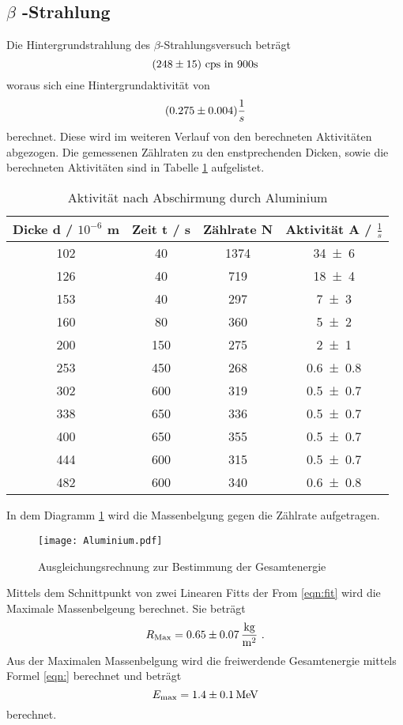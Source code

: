 \subsection{\texorpdfstring{$\beta$ -Strahlung }%
                               {beta -Strahlung}}
Die Hintergrundstrahlung des $\beta$-Strahlungsversuch beträgt 
\begin{equation}
  (\num{248 +- 15}) \text{ cps in } 900 \text{s}
  \label{eqn:hintb}
\end{equation}
woraus sich eine Hintergrundaktivität von 
\begin{equation}
  (\num{0.275 +- 0.004}) \frac{1}{s}
  \label{eqn:HAB}
\end{equation} 
berechnet. Diese wird im weiteren Verlauf von den berechneten Aktivitäten abgezogen. Die gemessenen Zählraten zu den enstprechenden Dicken, sowie die berechneten Aktivitäten sind in Tabelle \ref{tab:AAlu} aufgelistet. 
\begin{table}
  \centering
  \begin{tabular}{c c c c}
    \toprule
    Dicke d / $10^{-6}$ m & Zeit t / s & Zählrate N & Aktivität A / $\frac{1}{s}$ \\
    \midrule
    102&	40 &	1374&	\num{34 +-6 } \\	
    126&	40 &	719&	\num{18 +-4 } \\	
    153&	40 &	297&	\num{7 +-3 } \\	
    160&	80 &	360&	\num{5 +-2 } \\	
    200&	150&	275&	\num{2 +-1 } \\	
    253&	450&	268&	\num{0.6 +-0.8 } \\	
    302&	600&	319&	\num{0.5 +-0.7 } \\	
    338&	650&	336&	\num{0.5 +-0.7 } \\	
    400&	650&	355&	\num{0.5 +-0.7 } \\	
    444&	600&	315&	\num{0.5 +-0.7 } \\	
    482&	600&	340&	\num{0.6 +-0.8 } \\	
    \bottomrule
  \end{tabular}
  \caption{Aktivität nach Abschirmung durch Aluminium}
  \label{tab:AAlu}
\end{table}
In dem Diagramm \ref{fig:Alu} wird die Massenbelgung gegen die Zählrate aufgetragen. 
\begin{figure}
  \centering
  \texttt{[image: Aluminium.pdf]}
  \caption{Ausgleichungsrechnung zur Bestimmung der Gesamtenergie}
  \label{fig:Alu}
\end{figure}
Mittels dem Schnittpunkt von zwei Linearen Fitts der From \eqref{eqn:fit} wird die Maximale Massenbelgeung berechnet. Sie beträgt 
\begin{equation}
  R_\text{Max} = \num{0.65 +- 0.07} \, \frac{\text{kg}}{\text{m}^2} \ . 
  \label{eqn:Rmax}
\end{equation}
Aus der Maximalen Massenbelgung wird die freiwerdende Gesamtenergie mittels Formel \eqref{eqn:} berechnet und beträgt
\begin{equation}
  E_\text{max} = \num{1.4 +- 0.1} \, \text{MeV}
  \label{}
\end{equation}
berechnet.
